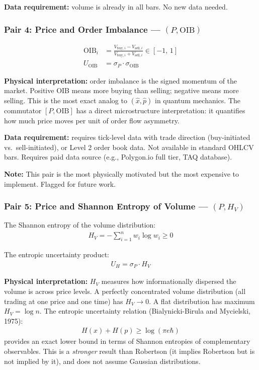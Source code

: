 \documentclass[11pt]{article}
\begin{document}
\textbf{Data requirement:} volume is already in all bars. No new data needed.

\subsubsection{Pair 4: Price and Order Imbalance --- $(P, \mathrm{OIB})$}

\begin{align}
    \mathrm{OIB}_i &= \frac{V_{\mathrm{buy},i} - V_{\mathrm{sell},i}}{V_{\mathrm{buy},i} + V_{\mathrm{sell},i}} \in [-1,\, 1] \\
    U_{\mathrm{OIB}} &= \sigma_P \cdot \sigma_{\mathrm{OIB}}
\end{align}

\textbf{Physical interpretation:} order imbalance is the signed momentum of the market. Positive OIB means more buying than selling; negative means more selling. This is the most exact analog to $(\hat{x}, \hat{p})$ in quantum mechanics. The commutator $[P, \mathrm{OIB}]$ has a direct microstructure interpretation: it quantifies how much price moves per unit of order flow asymmetry.

\textbf{Data requirement:} requires tick-level data with trade direction (buy-initiated vs.\ sell-initiated), or Level 2 order book data. Not available in standard OHLCV bars. Requires paid data source (e.g., Polygon.io full tier, TAQ database).

\textbf{Note:} This pair is the most physically motivated but the most expensive to implement. Flagged for future work.

\subsubsection{Pair 5: Price and Shannon Entropy of Volume --- $(P, H_V)$}

The Shannon entropy of the volume distribution:
\begin{align}
    H_V = -\sum_{i=1}^{n} w_i \log w_i \geq 0
\end{align}

The entropic uncertainty product:
\begin{align}
    U_H = \sigma_P \cdot H_V
\end{align}

\textbf{Physical interpretation:} $H_V$ measures how informationally dispersed the volume is across price levels. A perfectly concentrated volume distribution (all trading at one price and one time) has $H_V \to 0$. A flat distribution has maximum $H_V = \log n$. The entropic uncertainty relation (Bialynicki-Birula and Mycielski, 1975):
\begin{align}
    H(x) + H(p) \geq \log(\pi e \hbar)
\end{align}
provides an exact lower bound in terms of Shannon entropies of complementary observables. This is a \textit{stronger} result than Robertson (it implies Robertson but is not implied by it), and does not assume Gaussian distributions.
\end{document}
